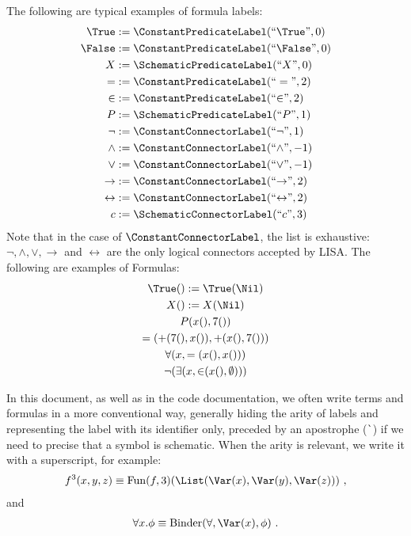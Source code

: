 \begin{example}[Formula]The following are typical examples of formula labels:
  \begin{align*}
    \True           & := \ConstantPredicateLabel(``\True", 0)             \\
    \False          & := \ConstantPredicateLabel(``\False", 0)            \\
    X               & := \SchematicPredicateLabel(``X", 0)                \\
    =               & := \ConstantPredicateLabel(``=", 2)                 \\
    {\in}           & := \ConstantPredicateLabel(``{\in}", 2)             \\
    P               & := \SchematicPredicateLabel(``P", 1)                \\
    \neg            & := \ConstantConnectorLabel(``{\neg}", 1)            \\
    \land           & := \ConstantConnectorLabel(``{\land}", -1)          \\
    \lor            & := \ConstantConnectorLabel(``{\lor}", -1)           \\
    \rightarrow     & := \ConstantConnectorLabel(``{\rightarrow}", 2)     \\
    \leftrightarrow & := \ConstantConnectorLabel(``{\leftrightarrow}", 2) \\
    c               & := \SchematicConnectorLabel(``{c}", 3)              \\
  \end{align*}
  Note that in the case of $\ConstantConnectorLabel$, the list is exhaustive: $\neg, \land, \lor, \rightarrow$ and $\leftrightarrow$ are the only logical connectors accepted by LISA.
  The following are examples of Formulas:
  \begin{gather*}
    \True() := \True(\Nil)\\
    X() := X(\Nil)\\
    P(x(), 7()) \\
    =(+(7(), x()), +(x(), 7()))\\
    \forall(x, =(x(), x())) \\
    \neg(\exists(x, {\in}(x(), \emptyset)))
  \end{gather*}
\end{example}

In this document, as well as in the code documentation, we often write terms and formulas in a more conventional way, generally hiding the arity of labels and representing the label with its identifier only, preceded by an apostrophe (\lstinline|`|) if we need to precise that a symbol is schematic. When the arity is relevant, we write it with a superscript, for example:
%
\begin{gather*}
  f^3(x,y,z) \equiv \operatorname{Fun}(f, 3)(\List(\Var(x), \Var(y), \Var(z)))~,
\end{gather*}
%
and
%
\begin{gather*}
  \forall x. \phi \equiv \operatorname{Binder}(\forall, \Var(x), \phi)~.
\end{gather*}

